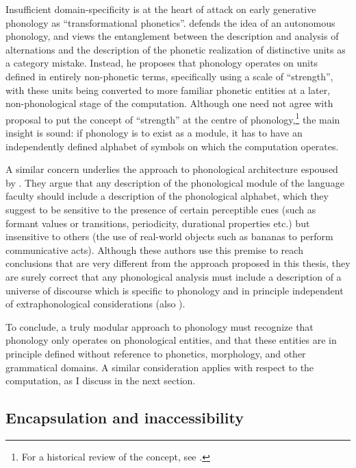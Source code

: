 Insufficient domain\hyp specificity is at the heart of  attack on early generative phonology as \enquote{transformational phonetics}. \citet{foley77:_found} defends the idea of an autonomous phonology, and views the entanglement between the description and analysis of alternations and the description of the phonetic realization of distinctive units as a category mistake. Instead, he proposes that phonology operates on units defined in entirely non\hyp phonetic terms, specifically using a scale of \enquote{strength}, with these units being converted to more familiar phonetic entities at a later, non\hyp phonological stage of the computation. Although one need not agree with  proposal to put the concept of \enquote{strength} at the centre of phonology,\footnote{For a historical review of the concept, see \citet{honeybone08:_lenit}.} the main insight is sound: if phonology is to exist as a module, it has to have an independently defined alphabet of symbols on which the computation operates.

A similar concern underlies the approach to phonological architecture espoused by \citet{reiss07:_modul,hale-kissock-reiss,hale-reiss2008}. They argue that any description of the phonological module of the language faculty should include a description of the phonological alphabet, which they suggest to be sensitive to the presence of certain perceptible cues (such as formant values or transitions, periodicity, durational properties etc.) but insensitive to others (\eg the use of real\hyp world objects such as bananas to perform communicative acts). Although these authors use this premise to reach conclusions that are very different from the approach proposed in this thesis, they are surely correct that any phonological analysis must include a description of a universe of discourse which is specific to phonology and in principle independent of extraphonological considerations (\cf also \citealt{blaho-diss,samuels11:_phonol}).

To conclude, a truly modular approach to phonology must recognize that phonology only operates on phonological entities, and that these entities are in principle defined without reference to phonetics, morphology, and other grammatical domains. A similar consideration applies with respect to the computation, as I discuss in the next section.

\subsection{Encapsulation and inaccessibility}
\label{sec:encaps-impen}

